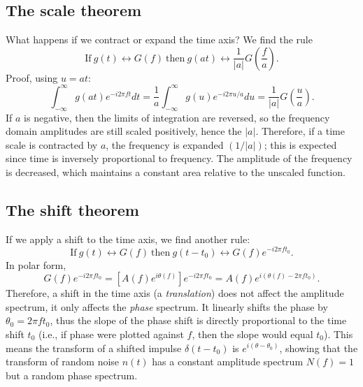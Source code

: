 \subsection{The scale theorem}
What happens if we contract or expand the time axis?  We find the rule
\begin{equation}
\mbox{If} \ g(t) \leftrightarrow G (f)\ \mbox{then} \ g(at) \leftrightarrow \displaystyle \frac{1}{|a|} G \left (\frac{f}{a}\right ).
\label{eq:scaletheorem}
\end{equation}
Proof, using $u = at$:
$$
\int^\infty_{-\infty} g(at) e^{-i 2 \pi f t} dt = \frac{1}{a} \int^\infty_{-\infty} g(u) e^{-i 2 \pi u/a} du = \frac {1}{|a|} G\left (\frac{u}{a}\right ).
$$
If $a$ is negative, then the limits of integration are reversed, so the frequency domain
amplitudes are still scaled positively, hence the $|a|$. Therefore, if a time scale is
contracted by $a$, the frequency is expanded $(1/|a|)$; this is expected since time is inversely
proportional to frequency. The amplitude of the frequency is decreased, which maintains
a constant area relative to the unscaled function.

\subsection{The shift theorem}
If we apply a shift to the time axis, we find another rule:
\begin{equation}
\mbox{If} \ g(t) \leftrightarrow G(f) \ \mbox{then} \ g(t-t_0) \leftrightarrow G(f) e^{-i 2\pi f t_0}.
\label{eq:shifttheorem}
\end{equation}
In polar form,
$$
G(f) e^{-i 2 \pi f t_0}=[A(f)e^{i \theta (f)}] e^{-i 2 \pi f t_0} = A(f)e^{i (\theta(f)- 2 \pi f t_0)}.
$$
Therefore, a shift in the time axis (a \emph{translation}) does not affect the amplitude spectrum, it
only affects the \emph{phase} spectrum.  It linearly shifts the phase by $\theta_0 = 2 \pi f t_0$, thus the
slope of the phase shift is directly proportional to the time shift $t_0$ (i.e., if phase were plotted
against $f$, then the slope would equal $t_0$).  This means the transform of a shifted impulse $\delta(t-t_0)$ is
$e^{i(\theta-\theta_0)}$, showing that the transform of random noise $n(t)$ has a constant amplitude spectrum $N(f) = 1$
but a random phase spectrum.

